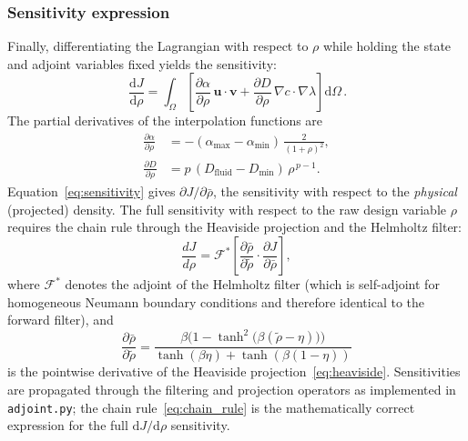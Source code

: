 \subsubsection{Sensitivity expression}
Finally, differentiating the Lagrangian with respect to \(\rho\) while holding the state and adjoint variables fixed yields the sensitivity:
\begin{equation}
    \boxed{\,
    \frac{\mathrm{d}J}{\mathrm{d}\rho} = \int_\Omega
        \left[ \frac{\partial\alpha}{\partial\rho}\,\mathbf{u}\cdot\mathbf{v}
             + \frac{\partial D}{\partial\rho}\,\nabla c\cdot\nabla\lambda \right] \mathrm{d}\Omega
    \,}.
    \label{eq:sensitivity}
\end{equation}
The partial derivatives of the interpolation functions are
\begin{align}
    \frac{\partial\alpha}{\partial\rho} &= -(\alpha_{\max} - \alpha_{\min})\,\frac{2}{(1+\rho)^2},
        \label{eq:dalpha} \\[4pt]
    \frac{\partial D}{\partial\rho} &= p\,(D_{\text{fluid}} - D_{\min})\,\rho^{\,p-1}.
        \label{eq:dD}
\end{align}
Equation~\eqref{eq:sensitivity} gives \(\partial J/\partial\bar{\rho}\), the sensitivity with respect to the \emph{physical} (projected) density.
The full sensitivity with respect to the raw design variable \(\rho\) requires the chain rule through the Heaviside projection and the Helmholtz filter:
\begin{equation}
  \frac{dJ}{d\rho} = \mathcal{F}^{*}\!\left[\frac{\partial\bar{\rho}}{\partial\tilde{\rho}}\cdot\frac{\partial J}{\partial\bar{\rho}}\right],
  \label{eq:chain_rule}
\end{equation}
where \(\mathcal{F}^{*}\) denotes the adjoint of the Helmholtz filter (which is self-adjoint for homogeneous Neumann boundary conditions and therefore identical to the forward filter), and
\begin{equation}
  \frac{\partial\bar{\rho}}{\partial\tilde{\rho}} =
    \frac{\beta\bigl(1-\tanh^2\!\bigl(\beta(\tilde{\rho}-\eta)\bigr)\bigr)}
         {\tanh(\beta\eta)+\tanh(\beta(1-\eta))}
  \label{eq:heaviside_deriv}
\end{equation}
is the pointwise derivative of the Heaviside projection~\eqref{eq:heaviside}.
Sensitivities are propagated through the filtering and projection operators
as implemented in \texttt{adjoint.py};
the chain rule~\eqref{eq:chain_rule} is the mathematically correct expression
for the full $\mathrm{d}J/\mathrm{d}\rho$ sensitivity.

